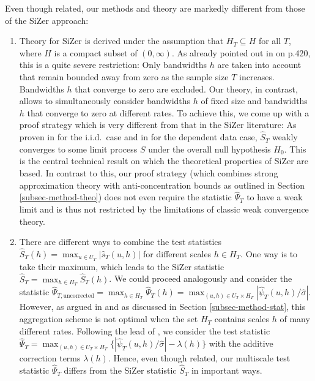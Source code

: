 Even though related, our methods and theory are markedly different from those of the SiZer approach:
\begin{enumerate}[label=(\roman*), leftmargin=0.75cm]

\item Theory for SiZer is derived under the assumption that $H_T \subseteq H$ for all $T$, where $H$ is a compact subset of $(0,\infty)$. As already pointed out in \cite{ChaudhuriMarron2000} on p.420, this is a quite severe restriction: Only bandwidths $h$ are taken into account that remain bounded away from zero as the sample size $T$ increases. Bandwidths $h$ that converge to zero are excluded. Our theory, in contrast, allows to simultaneously consider bandwidths $h$ of fixed size and bandwidths $h$ that converge to zero at different rates. To achieve this, we come up with a proof strategy which is very different from that in the SiZer literature:  As proven in \cite{ChaudhuriMarron2000} for the i.i.d.\ case and in \cite{ParkHannigKang2009} for the dependent data case, $\widehat{S}_T$ weakly converges to some limit process $S$ under the overall null hypothesis $H_0$. This is the central technical result on which the theoretical properties of SiZer are based. In contrast to this, our proof strategy (which combines strong approximation theory with anti-concentration bounds as outlined in Section \ref{subsec-method-theo}) does not even require the statistic $\widehat{\Psi}_T$ to have a weak limit and is thus not restricted by the limitations of classic weak convergence theory. 

\item There are different ways to combine the test statistics $\widehat{S}_T(h) = \max_{u \in U_T} |\widehat{s}_T(u,h)|$ for different scales $h \in H_T$. One way is to take their maximum, which leads to the SiZer statistic $\widehat{S}_T = \max_{h \in H_T} \widehat{S}_T(h)$. We could proceed analogously and consider the statistic $\widehat{\Psi}_{T,\text{uncorrected}} = \max_{h \in H_T} \widehat{\Psi}_T(h) = \max_{(u,h) \in U_T \times H_T} |\widehat{\psi}_T(u,h)/\widehat{\sigma}|$. However, as argued in \cite{DuembgenSpokoiny2001} and as discussed in Section \ref{subsec-method-stat}, this aggregation scheme is not optimal when the set $H_T$ contains scales $h$ of many different rates. Following the lead of \cite{DuembgenSpokoiny2001}, we consider the test statistic $\widehat{\Psi}_T = \max_{(u,h) \in U_T \times H_T} \{ |\widehat{\psi}_T(u,h)/\widehat{\sigma}| - \lambda(h) \}$ with the additive correction terms $\lambda(h)$. Hence, even though related, our multiscale test statistic $\widehat{\Psi}_T$ differs from the SiZer statistic $\widehat{S}_T$ in important ways. 


\end{enumerate}
